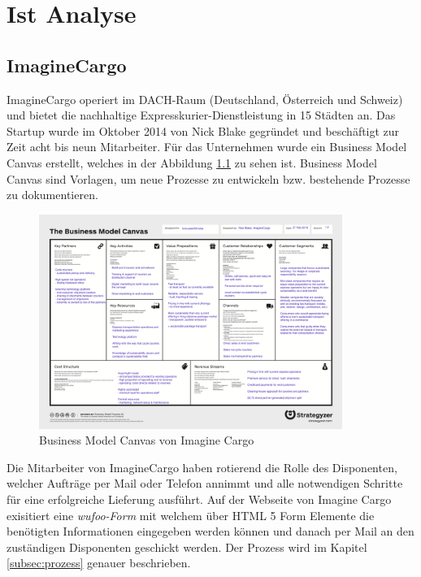 \chapter{Ist Analyse}
\label{sec:istanalyse}
\section{ImagineCargo}
ImagineCargo operiert im DACH-Raum (Deutschland, Österreich und Schweiz) und bietet die nachhaltige Expresskurier-Dienstleistung in 15 Städten an. Das Startup wurde im Oktober 2014 von Nick Blake gegründet und beschäftigt zur Zeit acht bis neun Mitarbeiter. Für das Unternehmen wurde ein Business Model Canvas erstellt, welches in der Abbildung \ref{fig1:businessmodelcanvas} zu sehen ist. Business Model Canvas sind Vorlagen, um neue Prozesse zu entwickeln bzw. bestehende Prozesse zu dokumentieren.
\begin{figure}[ht]
	\centering
  \includegraphics[width=0.88\textwidth]{images/businessModelCanvas.png}
	\caption{Business Model Canvas von Imagine Cargo}
	\label{fig1:businessmodelcanvas}
\end{figure}
 Die Mitarbeiter von ImagineCargo haben rotierend die Rolle des Disponenten, welcher Aufträge per Mail oder Telefon annimmt und alle notwendigen Schritte für eine erfolgreiche Lieferung ausführt. Auf der Webseite von Imagine Cargo exisitiert eine \textit{wufoo-Form} mit welchem über HTML 5 Form Elemente die benötigten Informationen eingegeben werden können und danach per Mail an den zuständigen Disponenten geschickt werden. Der Prozess wird im Kapitel \ref{subsec:prozess} genauer beschrieben.


